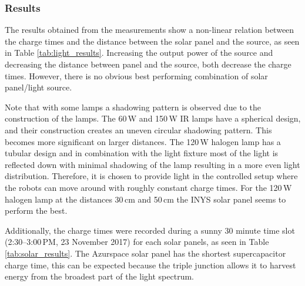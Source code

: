 \subsubsection{Results}

The results obtained from the measurements show a non-linear relation between the charge times and the distance between the solar panel and the source, as seen in Table \ref{tab:light_results}.
Increasing the output power of the source and decreasing the distance between panel and the source, both decrease the charge times.
However, there is no obvious best performing combination of solar panel/light source.

Note that with some lamps a shadowing pattern is observed due to the construction of the lamps.
The 60\,W and 150\,W IR lamps have a spherical design, and their construction creates an uneven circular shadowing pattern. 
This becomes more significant on larger distances.
The 120\,W halogen lamp has a tubular design and in combination with the light fixture most of the light is reflected down with minimal shadowing of the lamp resulting in a more even light distribution.
Therefore, it is chosen to provide light in the controlled setup where the robots can move around with roughly constant charge times.
For the 120\,W halogen lamp at the distances 30\,cm and 50\,cm the INYS solar panel seems to perform the best.

Additionally, the charge times were recorded during a sunny 30 minute time slot (2:30--3:00\,PM, 23 November 2017) for each solar panels, as seen in Table \ref{tab:solar_results}.
The Azurspace solar panel has the shortest supercapacitor charge time, this can be expected because the triple junction allows it to harvest energy from the broadest part of the light spectrum.



